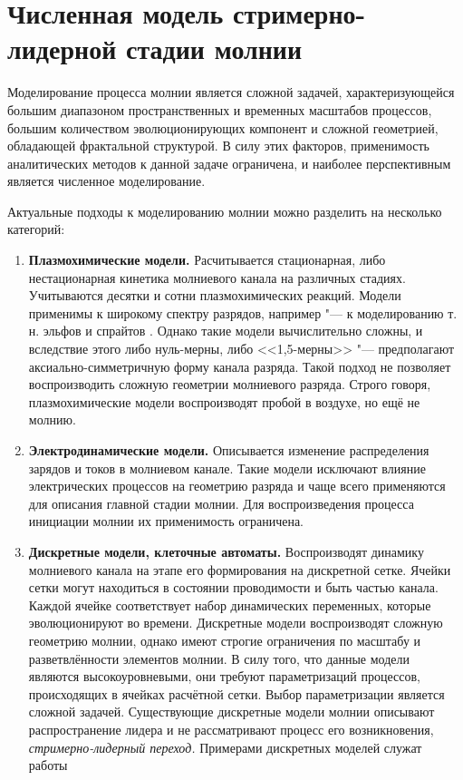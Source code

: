 \chapter{Численная модель стримерно-лидерной стадии молнии}
\label{sec:model-intro}
Моделирование процесса молнии является сложной задачей, характеризующейся большим диапазоном пространственных и временных масштабов процессов, большим количеством эволюционирующих компонент и сложной геометрией, обладающей фрактальной структурой. В силу этих факторов, применимость аналитических методов к данной задаче ограничена, и наиболее перспективным является численное моделирование.

Актуальные подходы к моделированию молнии можно разделить на несколько категорий:
\begin{enumerate}
	\item \textbf{Плазмохимические модели.} Расчитывается стационарная, либо нестационарная кинетика молниевого канала на различных стадиях. Учитываются десятки и сотни плазмохимических реакций. Модели применимы к широкому спектру разрядов, например "--- к моделированию т.\,н. эльфов и спрайтов \cite{Sentman2008}\cite{Kossiy1994}. Однако такие модели вычислительно сложны, и вследствие этого либо нуль-мерны, либо <<1,5-мерны>> "--- предполагают аксиально-симметричную форму канала разряда. Такой подход не позволяет воспроизводить сложную геометрии молниевого разряда. Строго говоря, плазмохимические модели воспроизводят пробой в воздухе, но ещё не молнию.
	\item \textbf{Электродинамические модели.} Описывается изменение распределения зарядов и токов в молниевом канале. Такие модели исключают влияние электрических процессов на геометрию разряда и чаще всего применяются для описания главной стадии молнии. Для воспроизведения процесса инициации молнии их применимость ограничена. 
	\item \textbf{Дискретные модели, клеточные автоматы.} Воспроизводят динамику молниевого канала на этапе его формирования на дискретной сетке. Ячейки сетки могут находиться в состоянии проводимости и быть частью канала. Каждой ячейке соответствует набор динамических переменных, которые эволюционируют во времени. Дискретные модели воспроизводят сложную геометрию молнии, однако имеют строгие ограничения по масштабу и разветвлённости элементов молнии. В силу того, что данные модели являются высокоуровневыми, они требуют параметризаций процессов, происходящих в ячейках расчётной сетки. Выбор параметризации является сложной задачей. Существующие дискретные модели молнии описывают распространение лидера и не рассматривают процесс его возникновения, \textit{стримерно-лидерный переход.} Примерами дискретных моделей служат работы \cite{Iudin2017}
\end{enumerate}

